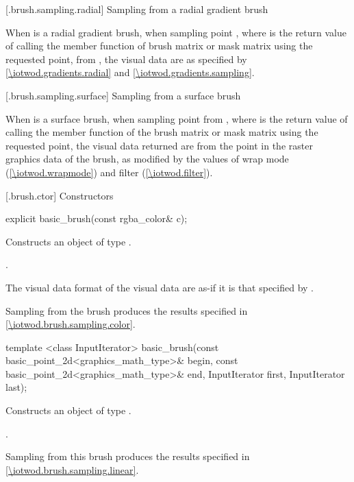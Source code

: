  [\iotwod.brush.sampling.radial] {Sampling from a radial gradient brush}

\pnum
When  is a radial gradient brush, when sampling point , where  is the return value of calling the  member function of brush matrix or mask matrix using the requested point, from , the visual data are as specified by \ref{\iotwod.gradients.radial} and \ref{\iotwod.gradients.sampling}.

 [\iotwod.brush.sampling.surface] {Sampling from a surface brush}

\pnum
When  is a surface brush, when sampling point  from , where  is the return value of calling the  member function of the brush matrix or mask matrix using the requested point, the visual data returned are from the point  in the raster graphics data of the brush, as modified by the values of wrap mode (\ref{\iotwod.wrapmode}) and filter (\ref{\iotwod.filter}).

 [\iotwod.brush.ctor] {Constructors}

%
\begin{itemdecl}
explicit basic_brush(const rgba_color& c);
\end{itemdecl}
\begin{itemdescr}
\pnum
\effects
Constructs an object of type .

\pnum
\postconditions
{}.

\pnum
\remarks
The visual data format of the visual data are as-if it is that specified by .

\pnum
Sampling from the brush produces the results specified in \ref{\iotwod.brush.sampling.color}.
\end{itemdescr}

%
\begin{itemdecl}
template <class InputIterator>
basic_brush(const basic_point_2d<graphics_math_type>& begin,
  const basic_point_2d<graphics_math_type>& end,
  InputIterator first, InputIterator last);
\end{itemdecl}
\begin{itemdescr}
\pnum
\effects
Constructs an object of type .

\pnum
\postconditions
{}.

\pnum
\remarks
Sampling from this brush produces the results specified in \ref{\iotwod.brush.sampling.linear}.
\end{itemdescr}

